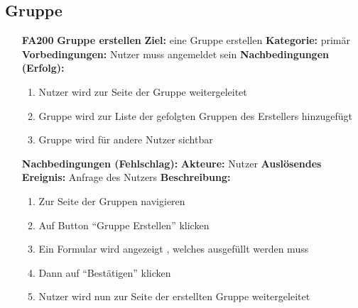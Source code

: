 \documentclass[parskip=full]{scrartcl}
\begin{document}
		\subsection{Gruppe} \label{sec:FAGruppe}
		\begin{itemize}[nosep]
			\item[\textbf{FA200}]\textbf{Gruppe erstellen}
			\newline \textbf{Ziel:} eine Gruppe erstellen
			\newline \textbf{Kategorie:} primär
			\newline \textbf{Vorbedingungen:} Nutzer muss angemeldet sein
			\newline \textbf{Nachbedingungen (Erfolg):} 
			\begin{enumerate}[nosep]
				\item Nutzer wird zur Seite der Gruppe weitergeleitet
				\item Gruppe wird zur Liste der gefolgten Gruppen des Erstellers hinzugefügt
				\item Gruppe wird für andere Nutzer sichtbar
			\end{enumerate}
			\textbf{Nachbedingungen (Fehlschlag):}
			\newline \textbf{Akteure:} Nutzer
			\newline \textbf{Auslösendes Ereignis:} Anfrage des Nutzers
			\newline \textbf{Beschreibung:}
			\begin{enumerate}[nosep]
				\item Zur Seite der Gruppen navigieren
				\item Auf Button “Gruppe Erstellen” klicken
				\item Ein Formular wird angezeigt , welches ausgefüllt werden muss
				\item Dann auf “Bestätigen” klicken
				\item Nutzer wird nun zur Seite der erstellten Gruppe weitergeleitet\\
			\end{enumerate}
			

\end{itemize}
\end{document}
